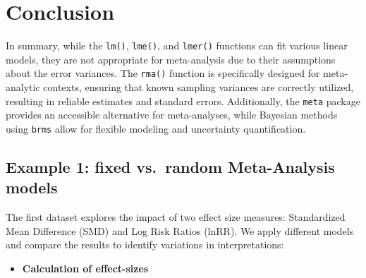 \documentclass[
]{book}
\providecommand{\tightlist}{%
  \setlength{\itemsep}{0pt}\setlength{\parskip}{0pt}}
\begin{document}
\section{Conclusion}\label{conclusion}

In summary, while the \texttt{lm()}, \texttt{lme()}, and \texttt{lmer()} functions can fit various linear models, they are not appropriate for meta-analysis due to their assumptions about the error variances. The \texttt{rma()} function is specifically designed for meta-analytic contexts, ensuring that known sampling variances are correctly utilized, resulting in reliable estimates and standard errors. Additionally, the \texttt{meta} package provides an accessible alternative for meta-analyses, while Bayesian methods using \texttt{brms} allow for flexible modeling and uncertainty quantification.

\subsection{Example 1: fixed vs.~random Meta-Analysis models}\label{example-1-fixed-vs.-random-meta-analysis-models}

\hfill\break
The first dataset explores the impact of two effect size measures: Standardized Mean Difference (SMD) and Log Risk Ratios (lnRR). We apply different models and compare the results to identify variations in interpretations:

\begin{itemize}
\tightlist
\item
  \textbf{Calculation of effect-sizes}
\end{itemize}
\end{document}
